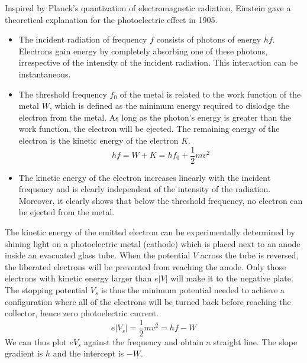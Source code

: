 \documentclass[a4paper]{article}
\begin{document}
\begin{Note}
Inspired by Planck's quantization of electromagnetic radiation, Einstein gave a theoretical explanation for the photoelectric effect in 1905.
\begin{itemize}
\item The incident radiation of frequency $f$ consists of photons of energy $hf$. Electrons gain energy by completely absorbing one of these photons, irrespective of the intensity of the incident radiation. This interaction can be instantaneous.
\item The threshold frequency $f_0$ of the metal is related to the work function of the metal $W$, which is defined as the minimum energy required to dislodge the electron from the metal. As long as the photon's energy is greater than the work function, the electron will be ejected. The remaining energy of the electron is the kinetic energy of the electron $K$.
$$hf=W+K=hf_0+\frac{1}{2}mv^2$$
\item The kinetic energy of the electron increases linearly with the incident frequency and is clearly independent of the intensity of the radiation. Moreover, it clearly shows that below the threshold frequency, no electron can be ejected from the metal.
\end{itemize}
The kinetic energy of the emitted electron can be experimentally determined by shining light on a photoelectric metal (cathode) which is placed next to an anode inside an evacuated glass tube. When the potential $V$ across the tube is reversed, the liberated electrons will be prevented from reaching the anode. Only those electrons with kinetic energy larger than $e|V|$ will make it to the negative plate. The stopping potential $V_s$ is thus the minimum potential needed to achieve a configuration where all of the electrons will be turned back before reaching the collector, hence zero photoelectric current.
$$e|V_s|=\frac{1}{2}mv^2=hf-W$$
We can thus plot $eV_s$ against the frequency and obtain a straight line. The slope gradient is $h$ and the intercept is $-W$.
\end{Note}
\newpage
\end{document}
